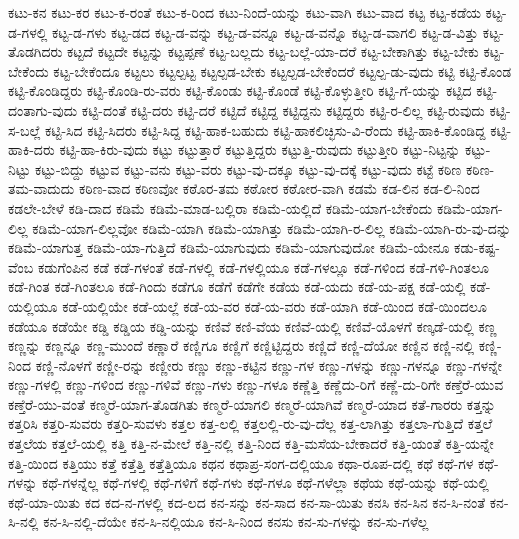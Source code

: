 {ಕಟು-ಕನ
ಕಟು-ಕರ
ಕಟು-ಕ-ರಂತೆ
ಕಟು-ಕ-ರಿಂದ
ಕಟು-ನಿಂದೆ-ಯನ್ನು
ಕಟು-ವಾಗಿ
ಕಟು-ವಾದ
ಕಟ್ಟ
ಕಟ್ಟ-ಕಡೆಯ
ಕಟ್ಟ-ಡ-ಗಳಲ್ಲಿ
ಕಟ್ಟ-ಡ-ಗಳು
ಕಟ್ಟ-ಡದ
ಕಟ್ಟ-ಡ-ವನ್ನು
ಕಟ್ಟ-ಡ-ವನ್ನೂ
ಕಟ್ಟ-ಡ-ವನ್ನೊ
ಕಟ್ಟ-ಡ-ವಾಗಲಿ
ಕಟ್ಟ-ಡ-ವಿತ್ತು
ಕಟ್ಟ-ತೊಡಗಿದರು
ಕಟ್ಟದೆ
ಕಟ್ಟದೇ
ಕಟ್ಟನ್ನು
ಕಟ್ಟಪ್ಪಣೆ
ಕಟ್ಟ-ಬಲ್ಲದು
ಕಟ್ಟ-ಬಲ್ಲೆ-ಯಾ-ದರೆ
ಕಟ್ಟ-ಬೇಕಾಗಿತ್ತು
ಕಟ್ಟ-ಬೇಕು
ಕಟ್ಟ-ಬೇಕೆಂದು
ಕಟ್ಟ-ಬೇಕೆಂದೂ
ಕಟ್ಟಲು
ಕಟ್ಟಲ್ಪಟ್ಟ
ಕಟ್ಟಲ್ಪಡ-ಬೇಕು
ಕಟ್ಟಲ್ಪಡ-ಬೇಕೆಂದರೆ
ಕಟ್ಟಲ್ಪ-ಡು-ವುದು
ಕಟ್ಟಿ
ಕಟ್ಟಿ-ಕೊಂಡ
ಕಟ್ಟಿ-ಕೊಂಡಿದ್ದರು
ಕಟ್ಟಿ-ಕೊಂಡಿ-ರು-ವರು
ಕಟ್ಟಿ-ಕೊಂಡು
ಕಟ್ಟಿ-ಕೊಂಡೆ
ಕಟ್ಟಿ-ಕೊಳ್ಳುತ್ತೀರಿ
ಕಟ್ಟಿ-ಗೆ-ಯನ್ನು
ಕಟ್ಟಿದ
ಕಟ್ಟಿ-ದಂತಾಗು-ವುದು
ಕಟ್ಟಿ-ದಂತೆ
ಕಟ್ಟಿ-ದರು
ಕಟ್ಟಿ-ದರೆ
ಕಟ್ಟಿದೆ
ಕಟ್ಟಿದ್ದ
ಕಟ್ಟಿದ್ದನು
ಕಟ್ಟಿದ್ದರು
ಕಟ್ಟಿ-ರ-ಲಿಲ್ಲ
ಕಟ್ಟಿ-ರುವುದು
ಕಟ್ಟಿ-ಸ-ಬಲ್ಲೆ
ಕಟ್ಟಿ-ಸಿದ
ಕಟ್ಟಿ-ಸಿದರು
ಕಟ್ಟಿ-ಸಿದ್ದ
ಕಟ್ಟಿ-ಹಾಕ-ಬಹುದು
ಕಟ್ಟಿ-ಹಾಕಲಿಚ್ಛಿಸು-ವಿ-ರೆಂದು
ಕಟ್ಟಿ-ಹಾಕಿ-ಕೊಂಡಿದ್ದ
ಕಟ್ಟಿ-ಹಾಕಿ-ದರು
ಕಟ್ಟಿ-ಹಾ-ಕಿರು-ವುದು
ಕಟ್ಟು
ಕಟ್ಟುತ್ತಾರೆ
ಕಟ್ಟುತ್ತಿದ್ದರು
ಕಟ್ಟುತ್ತಿ-ರುವುದು
ಕಟ್ಟುತ್ತೀರಿ
ಕಟ್ಟು-ನಿಟ್ಟನ್ನು
ಕಟ್ಟು-ನಿಟ್ಟು
ಕಟ್ಟು-ಬಿದ್ದು
ಕಟ್ಟುವ
ಕಟ್ಟು-ವನು
ಕಟ್ಟು-ವರು
ಕಟ್ಟು-ವು-ದಕ್ಕೂ
ಕಟ್ಟು-ವು-ದಕ್ಕೆ
ಕಟ್ಟು-ವುದು
ಕಟ್ಟೆ
ಕಠಿಣ
ಕಠಿಣ-ತಮ-ವಾದುದು
ಕಠಿಣ-ವಾದ
ಕಠಿಣವೋ
ಕಠೊರ-ತಮ
ಕಠೋರ
ಕಠೋರ-ವಾಗಿ
ಕಡಮೆ
ಕಡ-ಲಿನ
ಕಡ-ಲಿ-ನಿಂದ
ಕಡಲೇ-ಬೇಳೆ
ಕಡಿ-ದಾದ
ಕಡಿಮೆ
ಕಡಿಮೆ-ಮಾಡ-ಬಲ್ಲಿರಾ
ಕಡಿಮೆ-ಯಲ್ಲಿದೆ
ಕಡಿಮೆ-ಯಾಗ-ಬೇಕೆಂದು
ಕಡಿಮೆ-ಯಾಗ-ಲಿಲ್ಲ
ಕಡಿಮೆ-ಯಾಗ-ಲಿಲ್ಲವೋ
ಕಡಿಮೆ-ಯಾಗಿ
ಕಡಿಮೆ-ಯಾಗಿತ್ತು
ಕಡಿಮೆ-ಯಾಗಿ-ರ-ಲಿಲ್ಲ
ಕಡಿಮೆ-ಯಾಗಿ-ರು-ವು-ದನ್ನು
ಕಡಿಮೆ-ಯಾಗುತ್ತ
ಕಡಿಮೆ-ಯಾ-ಗುತ್ತಿದೆ
ಕಡಿಮೆ-ಯಾಗುವುದು
ಕಡಿಮೆ-ಯಾಗುವುದೋ
ಕಡಿಮೆ-ಯೇನೂ
ಕಡು-ಕಷ್ಟ-ವೆಂಬ
ಕಡುಗೆಂಪಿನ
ಕಡೆ
ಕಡೆ-ಗಳಂತೆ
ಕಡೆ-ಗಳಲ್ಲಿ
ಕಡೆ-ಗಳಲ್ಲಿಯೂ
ಕಡೆ-ಗಳಲ್ಲೂ
ಕಡೆ-ಗಳಿಂದ
ಕಡೆ-ಗಳಿ-ಗಿಂತಲೂ
ಕಡೆ-ಗಿಂತ
ಕಡೆ-ಗಿಂತಲೂ
ಕಡೆ-ಗಿಂದು
ಕಡೆಗೂ
ಕಡೆಗೆ
ಕಡೆಗೇ
ಕಡೆಯ
ಕಡೆ-ಯದು
ಕಡೆ-ಯ-ಪಕ್ಷ
ಕಡೆ-ಯಲ್ಲಿ
ಕಡೆ-ಯಲ್ಲಿಯೂ
ಕಡೆ-ಯಲ್ಲಿಯೇ
ಕಡೆ-ಯಲ್ಲೆ
ಕಡೆ-ಯ-ವರ
ಕಡೆ-ಯ-ವರು
ಕಡೆ-ಯಾಗಿ
ಕಡೆ-ಯಿಂದ
ಕಡೆ-ಯಿಂದಲೂ
ಕಡೆಯೂ
ಕಡೆಯೇ
ಕಡ್ಡಿ
ಕಡ್ಡಿಯ
ಕಡ್ಡಿ-ಯನ್ನು
ಕಣಿವೆ
ಕಣಿ-ವೆಯ
ಕಣಿವೆ-ಯಲ್ಲಿ
ಕಣಿವೆ-ಯೊಳಗೆ
ಕಣ್ಕಡೆ-ಯಲ್ಲಿ
ಕಣ್ಣ
ಕಣ್ಣನ್ನು
ಕಣ್ಣನ್ನೂ
ಕಣ್ಣ-ಮುಂದೆ
ಕಣ್ಣಾರೆ
ಕಣ್ಣಿಗೂ
ಕಣ್ಣಿಗೆ
ಕಣ್ಣಿಟ್ಟಿದ್ದರು
ಕಣ್ಣಿದೆ
ಕಣ್ಣಿ-ದೆಯೋ
ಕಣ್ಣಿನ
ಕಣ್ಣಿ-ನಲ್ಲಿ
ಕಣ್ಣಿ-ನಿಂದ
ಕಣ್ಣಿ-ನೊಳಗೆ
ಕಣ್ಣೀ-ರನ್ನು
ಕಣ್ಣೀರು
ಕಣ್ಣು
ಕಣ್ಣು-ಕಟ್ಟಿನ
ಕಣ್ಣು-ಗಳ
ಕಣ್ಣು-ಗಳನ್ನು
ಕಣ್ಣು-ಗಳನ್ನೂ
ಕಣ್ಣು-ಗಳನ್ನೇ
ಕಣ್ಣು-ಗಳಲ್ಲಿ
ಕಣ್ಣು-ಗಳಿಂದ
ಕಣ್ಣು-ಗಳಿವೆ
ಕಣ್ಣು-ಗಳು
ಕಣ್ಣು-ಗಳೂ
ಕಣ್ಣೆತ್ತಿ
ಕಣ್ಣೆದು-ರಿಗೆ
ಕಣ್ಣೆ-ದು-ರಿಗೇ
ಕಣ್ತೆರೆ-ಯುವ
ಕಣ್ತೆರೆ-ಯು-ವಂತೆ
ಕಣ್ಮರೆ-ಯಾಗ-ತೊಡಗಿತು
ಕಣ್ಮರೆ-ಯಾಗಲಿ
ಕಣ್ಮರೆ-ಯಾಗಿವೆ
ಕಣ್ಮರೆ-ಯಾದ
ಕತೆ-ಗಾರರು
ಕತ್ತನ್ನು
ಕತ್ತರಿಸಿ
ಕತ್ತರಿ-ಸುವರು
ಕತ್ತರಿ-ಸುವಳು
ಕತ್ತಲ
ಕತ್ತ-ಲಲ್ಲಿ
ಕತ್ತಲಲ್ಲಿ-ರು-ವು-ದೆಲ್ಲ
ಕತ್ತ-ಲಾಗಿತ್ತು
ಕತ್ತಲಾ-ಗುತ್ತಿದೆ
ಕತ್ತಲೆ
ಕತ್ತಲೆಯ
ಕತ್ತಲೆ-ಯಲ್ಲಿ
ಕತ್ತಿ
ಕತ್ತಿ-ನ-ಮೇಲೆ
ಕತ್ತಿ-ನಲ್ಲಿ
ಕತ್ತಿ-ನಿಂದ
ಕತ್ತಿ-ಮಸೆಯ-ಬೇಕಾದರೆ
ಕತ್ತಿ-ಯಂತೆ
ಕತ್ತಿ-ಯನ್ನೇ
ಕತ್ತಿ-ಯಿಂದ
ಕತ್ತಿಯು
ಕತ್ತೆ
ಕತ್ತೆತ್ತಿ
ಕತ್ತೆತ್ತಿಯೂ
ಕಥನ
ಕಥಾಪ್ರ-ಸಂಗ-ದಲ್ಲಿಯೂ
ಕಥಾ-ರೂಪ-ದಲ್ಲಿ
ಕಥೆ
ಕಥೆ-ಗಳ
ಕಥೆ-ಗಳನ್ನು
ಕಥೆ-ಗಳನ್ನೆಲ್ಲ
ಕಥೆ-ಗಳಲ್ಲಿ
ಕಥೆ-ಗಳಿಗೆ
ಕಥೆ-ಗಳು
ಕಥೆ-ಗಳೂ
ಕಥೆ-ಗಳೆಲ್ಲಾ
ಕಥೆಯ
ಕಥೆ-ಯನ್ನು
ಕಥೆ-ಯಲ್ಲಿ
ಕಥೆ-ಯಾ-ಯಿತು
ಕದ
ಕದ-ನ-ಗಳಲ್ಲಿ
ಕದ-ಲದ
ಕನ-ಸನ್ನು
ಕನ-ಸಾದ
ಕನ-ಸಾ-ಯಿತು
ಕನಸಿ
ಕನ-ಸಿನ
ಕನ-ಸಿ-ನಂತೆ
ಕನ-ಸಿ-ನಲ್ಲಿ
ಕನ-ಸಿ-ನಲ್ಲಿ-ದೆಯೇ
ಕನ-ಸಿ-ನಲ್ಲಿಯೂ
ಕನ-ಸಿ-ನಿಂದ
ಕನಸು
ಕನ-ಸು-ಗಳನ್ನು
ಕನ-ಸು-ಗಳೆಲ್ಲ
}
